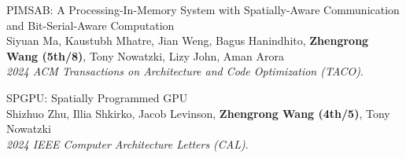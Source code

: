 \documentclass[a4paper]{article}
\newenvironment{changemargin}[2]{%
  \begin{list}{}{%
    \setlength{\topsep}{0pt}%
    \setlength{\leftmargin}{#1}%
    \setlength{\rightmargin}{#2}%
    \setlength{\listparindent}{\parindent}%
    \setlength{\itemindent}{\parindent}%
    \setlength{\parsep}{\parskip}%
  }%
  \item[]}{\end{list}
}
\newenvironment{body} {
	\vspace*{-16pt}
	\begin{changemargin}{-0.5in}{-0.5in}
  }	
	{\end{changemargin}
}
\begin{document}
\begin{body}
	\vspace{14pt}
	PIMSAB: A Processing-In-Memory System with Spatially-Aware Communication and Bit-Serial-Aware Computation\\
	Siyuan Ma, Kaustubh Mhatre, Jian Weng, Bagus Hanindhito, \textbf{Zhengrong Wang (5th/8)}, Tony Nowatzki, Lizy John, Aman Arora\\
	\emph{2024 ACM Transactions on Architecture and Code Optimization (TACO)}.\\
	\vspace{6pt}

	SPGPU: Spatially Programmed GPU\\
	Shizhuo Zhu, Illia Shkirko, Jacob Levinson, \textbf{Zhengrong Wang (4th/5)}, Tony Nowatzki\\
	\emph{2024 IEEE Computer Architecture Letters (CAL)}.\\
	\vspace{6pt}
	\newpage


\end{body}
\end{document}
